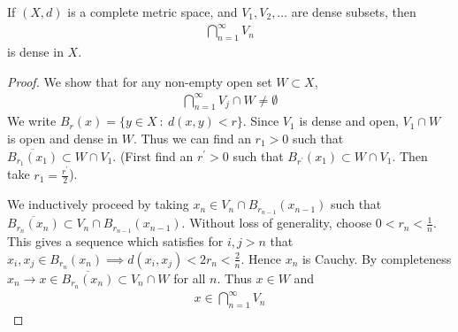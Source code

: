 \begin{theorem}
  \label{thm:Baire-Category-Rudin}
  If $(X, d)$ is a complete metric space, and $V_1 , V_2 , \ldots$
  are dense subsets, then
  \begin{align*}
    \bigcap_{n = 1}^{\infty} V_n
  \end{align*}
  is dense in $X$.
\end{theorem}
\begin{proof}
  We show that for any non-empty open set $W \subset X$,
  \begin{align*}
    \bigcap_{n = 1}^{\infty} V_j \cap W \neq \emptyset
  \end{align*}
  We write $B_r(x) = \{ y \in X  \ : \  d(x, y)< r \}$. Since $V_1$
  is dense and open, $V_{1} \cap W$ is open and dense in $W$. Thus we
  can find an $r_{1} > 0$ such that $\overline{B_{r_{1}}(x_1)}
  \subset W \cap V_1$. (First find an $r^\prime > 0$ such that
    $B_{r^\prime}(x_1) \subset W \cap V_{1}$. Then take $r_{1} =
  \frac{r^\prime}{2}$).

  We inductively proceed by taking $x_n \in V_n \cap
  B_{r_{n-1}}(x_{n-1})$ such that $\overline{B_{r_n}(x_n)} \subset
  V_n \cap B_{r_{n-1}}(x_{n-1})$. Without loss of generality, choose
  $0 < r_n < \frac{1}{n}$. This gives a sequence which satisfies for
  $i, j > n$ that $x_i, x_j \in B_{r_n}(x_n) \implies d(x_i, x_j) <
  2r_n < \frac{2}{n}$. Hence $x_n$ is Cauchy. By completeness $x_n
  \to x \in \overline{B_{r_n}(x_n)} \subset V_n \cap W$ for all $n$.
  Thus $x \in W$ and
  \begin{align*}
    x \in \bigcap_{n = 1}^{\infty}V_n
  \end{align*}
\end{proof}
